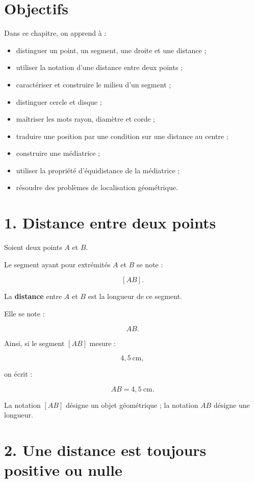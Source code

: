 
\section{Objectifs}

Dans ce chapitre, on apprend à :

\begin{itemize}
\item distinguer un point, un segment, une droite et une distance ;
\item utiliser la notation d’une distance entre deux points ;
\item caractériser et construire le milieu d’un segment ;
\item distinguer cercle et disque ;
\item maîtriser les mots rayon, diamètre et corde ;
\item traduire une position par une condition sur une distance au centre ;
\item construire une médiatrice ;
\item utiliser la propriété d’équidistance de la médiatrice ;
\item résoudre des problèmes de localisation géométrique.
\end{itemize}

\section{1. Distance entre deux points}

Soient deux points $A$ et $B$.

Le segment ayant pour extrémités $A$ et $B$ se note :

\[
[AB].
\]

La \textbf{distance} entre $A$ et $B$ est la longueur de ce segment.

Elle se note :

\[
AB.
\]

Ainsi, si le segment $[AB]$ mesure :

\[
4{,}5\ \text{cm},
\]

on écrit :

\[
AB=4{,}5\ \text{cm}.
\]

La notation $[AB]$ désigne un objet géométrique ; la notation $AB$ désigne une longueur.

\section{2. Une distance est toujours positive ou nulle}

